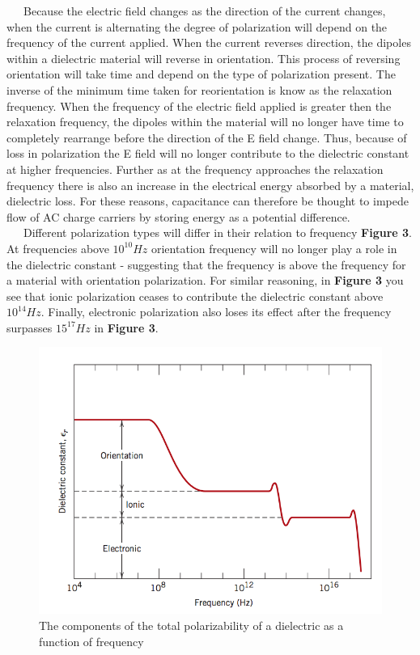 \documentclass{article}
\begin{document}
\ \ \ Because the electric field changes as the direction of the current changes, when the current is alternating the degree of polarization will depend on the frequency of the current applied. When the current reverses direction, the dipoles within a dielectric material will reverse in orientation. This process of reversing orientation will take time and depend on the type of polarization present. The inverse of the minimum time taken for reorientation is know as the relaxation frequency. When the frequency of the electric field applied is greater then the relaxation frequency, the dipoles within the material will no longer have time to completely rearrange before the direction of the E field change. Thus, because of loss in polarization the E field will no longer contribute to the dielectric constant at higher frequencies.  Further as at the frequency approaches the relaxation frequency there is also an increase in the electrical energy absorbed by a material, dielectric loss. For these reasons, capacitance can therefore be thought to impede flow of AC charge carriers by storing energy as a potential difference.\\
\ \ \ Different polarization types will differ in their relation to frequency \textbf{Figure 3}. At frequencies above $10^{10}Hz$ orientation frequency will no longer play a role in the dielectric constant - suggesting that the frequency is above the frequency for a material with orientation polarization. For similar reasoning, in \textbf{Figure 3} you see that ionic polarization ceases to contribute the dielectric constant above $10^{14}Hz$. Finally, electronic polarization also loses its effect after the frequency surpasses $15^{17}Hz$ in \textbf{Figure 3}.
\begin{figure}[h!]
\centering
\includegraphics[scale=0.4]{polarize.png}
\caption{The components of the total polarizability of a dielectric as a function of frequency}
\end{figure}
\end{document}
